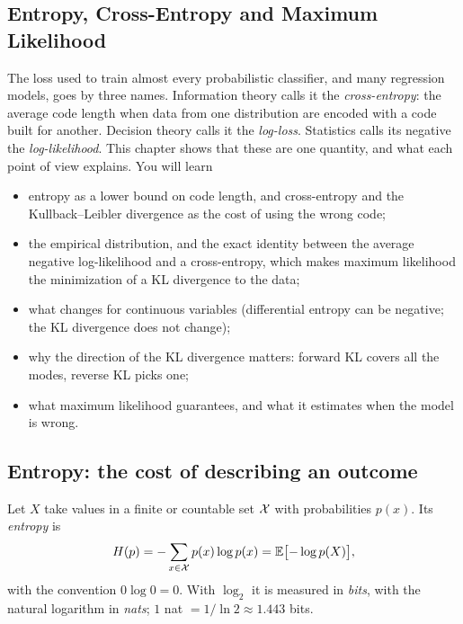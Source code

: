 \begin{notechapter}
\chapter{Entropy, Cross-Entropy and Maximum Likelihood}\label{ch:cross-entropy}

\begin{chapterintro}
The loss used to train almost every probabilistic classifier, and many
regression models, goes by three names. Information theory calls it the
\emph{cross-entropy}: the average code length when data from one distribution
are encoded with a code built for another. Decision theory calls it the
\emph{log-loss}. Statistics calls its negative the \emph{log-likelihood}. This
chapter shows that these are one quantity, and what each point of view
explains. You will learn
\begin{itemize}[nosep]
  \item entropy as a lower bound on code length, and cross-entropy and the
        Kullback--Leibler divergence as the cost of using the wrong code;
  \item the empirical distribution, and the exact identity between the average
        negative log-likelihood and a cross-entropy, which makes maximum likelihood
        the minimization of a KL divergence to the data;
  \item what changes for continuous variables (differential entropy can be
        negative; the KL divergence does not change);
  \item why the direction of the KL divergence matters: forward KL covers all the
        modes, reverse KL picks one;
  \item what maximum likelihood guarantees, and what it estimates when the model
        is wrong.
\end{itemize}
\end{chapterintro}

\section{Entropy: the cost of describing an outcome}\label{cross-entropy:sec:entropy}

\begin{definition}[Entropy]\label{cross-entropy:def:entropy}
Let $X$ take values in a finite or countable set $\mathcal{X}$ with probabilities
$p(x)$. Its \emph{entropy} is
\[
  H(p) = -\sum_{x\in\mathcal{X}}p(x)\log p(x) = \mathbb{E}\bigl[-\log p(X)\bigr],
\]
with the convention $0\log0 = 0$. With $\log_2$ it is measured in \emph{bits},
with the natural logarithm in \emph{nats}; $1$ nat $= 1/\ln2\approx1.443$ bits.
\end{definition}


\end{notechapter}
